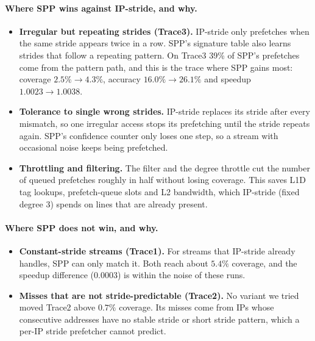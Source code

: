 \documentclass[11pt,a4paper]{article}
\begin{document}
\paragraph{Where SPP wins against IP-stride, and why.}
\begin{itemize}
    \item \textbf{Irregular but repeating strides (Trace3).} IP-stride only prefetches when the
          same stride appears twice in a row. SPP's signature table also learns strides that follow
          a repeating pattern. On Trace3 39\% of SPP's prefetches come from the pattern path, and this
          is the trace where SPP gains most: coverage $2.5\% \to 4.3\%$, accuracy
          $16.0\% \to 26.1\%$ and speedup $1.0023 \to 1.0038$.
    \item \textbf{Tolerance to single wrong strides.} IP-stride replaces its stride after every
          mismatch, so one irregular access stops its prefetching until the stride repeats again.
          SPP's confidence counter only loses one step, so a stream with occasional noise keeps being
          prefetched.
    \item \textbf{Throttling and filtering.} The filter and the degree throttle cut the number of
          queued prefetches roughly in half without losing coverage. This saves L1D tag lookups,
          prefetch-queue slots and L2 bandwidth, which IP-stride (fixed degree 3) spends on lines
          that are already present.
\end{itemize}

\paragraph{Where SPP does not win, and why.}
\begin{itemize}
    \item \textbf{Constant-stride streams (Trace1).} For streams that IP-stride already handles,
          SPP can only match it. Both reach about $5.4\%$ coverage, and the speedup difference
          ($0.0003$) is within the noise of these runs.
    \item \textbf{Misses that are not stride-predictable (Trace2).} No variant we tried moved
          Trace2 above $0.7\%$ coverage. Its misses come from IPs whose consecutive addresses have no
          stable stride or short stride pattern, which a per-IP stride prefetcher cannot predict.
\end{itemize}
\end{document}
